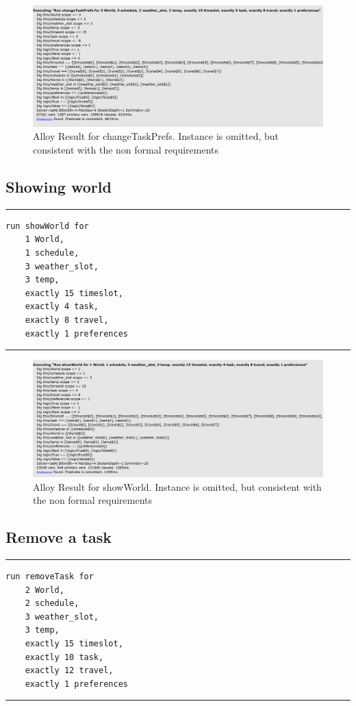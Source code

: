 \begin{figure}[H]
\centering
\includegraphics[scale=0.55]{Pictures/changeTaskPrefs.PNG}
\caption{Alloy Result for changeTaskPrefs. Instance is omitted, but
consistent with the non formal requirements}
\end{figure}

\subsection{Showing world}
\rule{\textwidth}{0.4pt}
\begin{verbatim}
run showWorld for 
    1 World,
    1 schedule,
    3 weather_slot,
    3 temp, 
    exactly 15 timeslot,
    exactly 4 task, 
    exactly 8 travel,
    exactly 1 preferences 
\end{verbatim}    
\rule{\textwidth}{0.4pt}

\begin{figure}[H]
\centering
\includegraphics[scale=0.55]{Pictures/showWorld.PNG}
\caption{Alloy Result for showWorld. Instance is omitted, but
consistent with the non formal requirements}
\end{figure}

\subsection{Remove a task}
\rule{\textwidth}{0.4pt}
\begin{verbatim}
run removeTask for 
    2 World,
    2 schedule,
    3 weather_slot,
    3 temp,
    exactly 15 timeslot,
    exactly 10 task,
    exactly 12 travel,
    exactly 1 preferences     
\end{verbatim}
\rule{\textwidth}{0.4pt}

